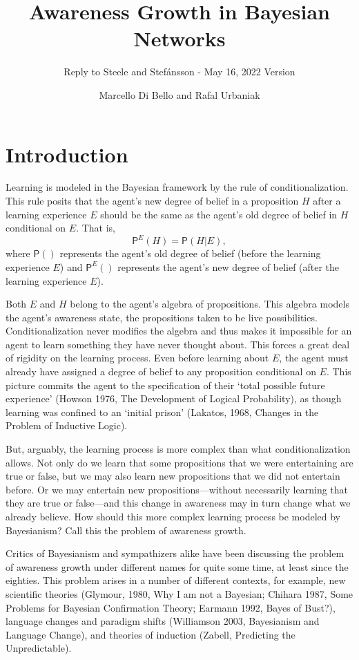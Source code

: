 \documentclass[
  11pt,
  dvipsnames,enabledeprecatedfontcommands]{scrartcl}
\title{Awareness Growth in Bayesian Networks}
\subtitle{Reply to Steele and Stefánsson - May 16, 2022 Version}
\author{Marcello Di Bello and Rafal Urbaniak}
\date{}
\newcommand{\pr}[1]{\ensuremath{\mathsf{P}(#1)}}
\newcommand{\ppr}[2]{\ensuremath{\mathsf{P}^{#1}(#2)}}
\begin{document}
\maketitle

\hypertarget{introduction}{%
\section{Introduction}\label{introduction}}

Learning is modeled in the Bayesian framework by the rule of
conditionalization. This rule posits that the agent's new degree of
belief in a proposition \(H\) after a learning experience \(E\) should
be the same as the agent's old degree of belief in \(H\) conditional on
\(E\). That is, \[\ppr{E}{H}=\pr{H \vert E},\] where \(\pr{}\)
represents the agent's old degree of belief (before the learning
experience \(E\)) and \(\ppr{E}{}\) represents the agent's new degree of
belief (after the learning experience \(E\)).

Both \(E\) and \(H\) belong to the agent's algebra of propositions. This
algebra models the agent's awareness state, the propositions taken to be
live possibilities. Conditionalization never modifies the algebra and
thus makes it impossible for an agent to learn something they have never
thought about. This forces a great deal of rigidity on the learning
process. Even before learning about \(E\), the agent must already have
assigned a degree of belief to any proposition conditional on \(E\).
This picture commits the agent to the specification of their `total
possible future experience' (Howson 1976, The Development of Logical
Probability), as though learning was confined to an `initial prison'
(Lakatos, 1968, Changes in the Problem of Inductive Logic).

But, arguably, the learning process is more complex than what
conditionalization allows. Not only do we learn that some propositions
that we were entertaining are true or false, but we may also learn new
propositions that we did not entertain before. Or we may entertain new
propositions---without necessarily learning that they are true or
false---and this change in awareness may in turn change what we already
believe. How should this more complex learning process be modeled by
Bayesianism? Call this the problem of awareness growth.

Critics of Bayesianism and sympathizers alike have been discussing the
problem of awareness growth under different names for quite some time,
at least since the eighties. This problem arises in a number of
different contexts, for example, new scientific theories (Glymour, 1980,
Why I am not a Bayesian; Chihara 1987, Some Problems for Bayesian
Confirmation Theory; Earmann 1992, Bayes of Bust?), language changes and
paradigm shifts (Williamson 2003, Bayesianism and Language Change), and
theories of induction (Zabell, Predicting the Unpredictable).
\end{document}
